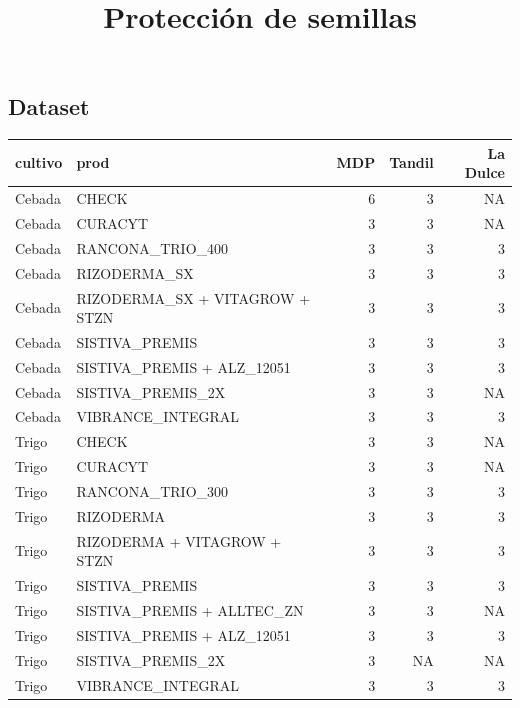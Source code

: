\documentclass[
  letterpaper,
  DIV=11,
  numbers=noendperiod]{scrartcl}
\title{Protección de semillas}
\author{}
\date{}
\begin{document}
\maketitle
\ifdefined\Shaded\renewenvironment{Shaded}{\begin{tcolorbox}[boxrule=0pt, interior hidden, frame hidden, borderline west={3pt}{0pt}{shadecolor}, sharp corners, enhanced, breakable]}{\end{tcolorbox}}\fi

\hypertarget{dataset}{%
\subsection{Dataset}\label{dataset}}

\begin{longtable}[]{@{}llrrr@{}}
\toprule()
cultivo & prod & MDP & Tandil & La Dulce \\
\midrule()
\endhead
Cebada & CHECK & 6 & 3 & NA \\
Cebada & CURACYT & 3 & 3 & NA \\
Cebada & RANCONA\_TRIO\_400 & 3 & 3 & 3 \\
Cebada & RIZODERMA\_SX & 3 & 3 & 3 \\
Cebada & RIZODERMA\_SX + VITAGROW + STZN & 3 & 3 & 3 \\
Cebada & SISTIVA\_PREMIS & 3 & 3 & 3 \\
Cebada & SISTIVA\_PREMIS + ALZ\_12051 & 3 & 3 & 3 \\
Cebada & SISTIVA\_PREMIS\_2X & 3 & 3 & NA \\
Cebada & VIBRANCE\_INTEGRAL & 3 & 3 & 3 \\
Trigo & CHECK & 3 & 3 & NA \\
Trigo & CURACYT & 3 & 3 & NA \\
Trigo & RANCONA\_TRIO\_300 & 3 & 3 & 3 \\
Trigo & RIZODERMA & 3 & 3 & 3 \\
Trigo & RIZODERMA + VITAGROW + STZN & 3 & 3 & 3 \\
Trigo & SISTIVA\_PREMIS & 3 & 3 & 3 \\
Trigo & SISTIVA\_PREMIS + ALLTEC\_ZN & 3 & 3 & NA \\
Trigo & SISTIVA\_PREMIS + ALZ\_12051 & 3 & 3 & 3 \\
Trigo & SISTIVA\_PREMIS\_2X & 3 & NA & NA \\
Trigo & VIBRANCE\_INTEGRAL & 3 & 3 & 3 \\
\bottomrule()
\end{longtable}
\end{document}
